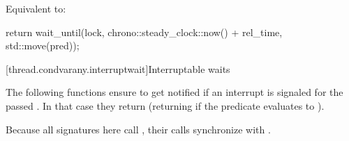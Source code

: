\begin{itemdescr}
\pnum
\effects Equivalent to:
\begin{codeblock}
return wait_until(lock, chrono::steady_clock::now() + rel_time, std::move(pred));
\end{codeblock}
\end{itemdescr}



\clearpage

{\color{insertcolor}


[thread.condvarany.interruptwait]{Interruptable waits}

The following functions ensure to get notified
if an interrupt is signaled for the passed .
In that case they return
(returning  if the predicate evaluates to ). 
\begin{note} 
        Because all signatures here call
        , their calls synchronize with .
      \end{note}




}
